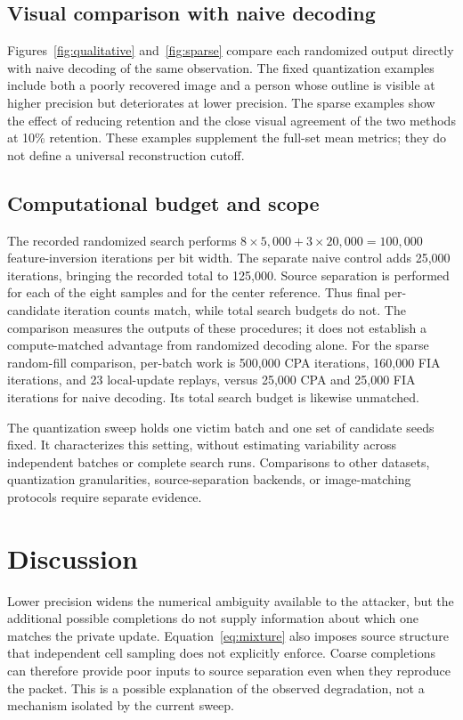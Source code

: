 \documentclass[10pt,twocolumn]{article}
\begin{document}
\subsection{Visual comparison with naive decoding}
\label{sec:qualitative}
Figures~\ref{fig:qualitative} and~\ref{fig:sparse} compare each randomized
output directly with naive decoding of the same observation. The fixed
quantization examples include both a poorly recovered image and a person
whose outline is visible at higher precision but deteriorates at lower
precision. The sparse examples show the effect of reducing retention and
the close visual agreement of the two methods at 10\% retention.
These examples supplement the full-set mean metrics; they do not define
a universal reconstruction cutoff.

\subsection{Computational budget and scope}
\label{sec:budget}
The recorded randomized search performs
$8\times5{,}000+3\times20{,}000=100{,}000$ feature-inversion iterations
per bit width. The separate naive control adds 25,000 iterations,
bringing the recorded total to 125,000. Source separation is performed
for each of the eight samples and for the center reference. Thus final
per-candidate iteration counts match, while total search budgets do not.
The comparison measures the outputs of these procedures; it does not
establish a compute-matched advantage from randomized decoding alone.
For the sparse random-fill comparison, per-batch work is 500,000 CPA
iterations, 160,000 FIA iterations, and 23 local-update replays, versus
25,000 CPA and 25,000 FIA iterations for naive decoding. Its total search
budget is likewise unmatched.

The quantization sweep holds one victim batch and one set of candidate seeds fixed.
It characterizes this setting, without estimating variability across
independent batches or complete search runs. Comparisons to other
datasets, quantization granularities, source-separation backends, or
image-matching protocols require separate evidence.

\section{Discussion}
\label{sec:discussion}
Lower precision widens the numerical ambiguity available to the attacker,
but the additional possible completions do not supply information about
which one matches the private update. Equation~\ref{eq:mixture} also
imposes source structure that independent cell sampling does not
explicitly enforce. Coarse completions can therefore provide poor
inputs to source separation even when they reproduce the packet.
This is a possible explanation of the observed degradation, not a
mechanism isolated by the current sweep.
\end{document}

